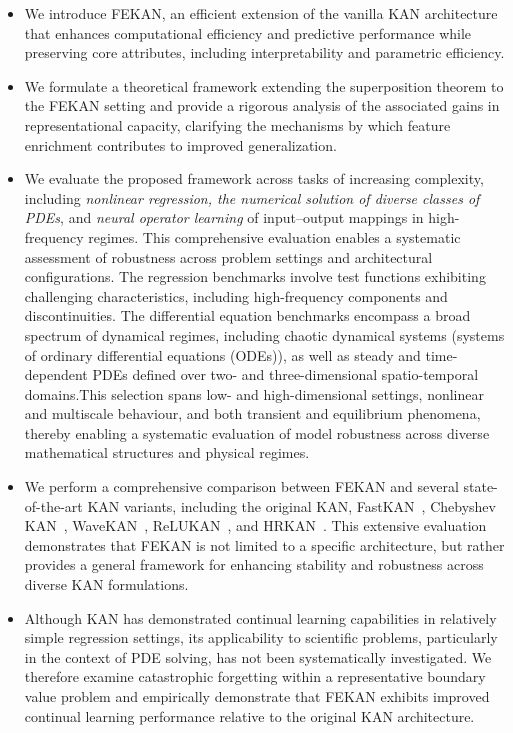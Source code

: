\documentclass{article}
\begin{document}
\begin{itemize}
    \item We introduce FEKAN, an efficient extension of the vanilla KAN architecture that enhances computational efficiency and predictive performance while preserving core attributes, including interpretability and parametric efficiency.
    \item We formulate a theoretical framework extending the superposition theorem to the FEKAN setting and provide a rigorous analysis of the associated gains in representational capacity, clarifying the mechanisms by which feature enrichment contributes to improved generalization.
    \item We evaluate the proposed framework across tasks of increasing complexity, including \textit{nonlinear regression, the numerical solution of diverse classes of PDEs}, and \textit{neural operator learning} of input–output mappings in high-frequency regimes. This comprehensive evaluation enables a systematic assessment of robustness across problem settings and architectural configurations.
    The regression benchmarks involve test functions exhibiting challenging characteristics, including high-frequency components and discontinuities. The differential equation benchmarks encompass a broad spectrum of dynamical regimes, including chaotic dynamical systems (systems of ordinary differential equations (ODEs)), as well as steady and time-dependent PDEs defined over two- and three-dimensional spatio-temporal domains.This selection spans low- and high-dimensional settings, nonlinear and multiscale behaviour, and both transient and equilibrium phenomena, thereby enabling a systematic evaluation of model robustness across diverse mathematical structures and physical regimes.

    \item We perform a comprehensive comparison between FEKAN and several state-of-the-art KAN variants, including the original KAN, FastKAN~\cite{li2024kolmogorov}, Chebyshev KAN~\cite{ss2024chebyshev}, WaveKAN~\cite{bozorgasl2405wav}, ReLUKAN~\cite{qiu2024relu}, and HRKAN~\cite{so2025higher}. This extensive evaluation demonstrates that FEKAN is not limited to a specific architecture, but rather provides a general framework for enhancing stability and robustness across diverse KAN formulations.

    \item Although KAN has demonstrated continual learning capabilities in relatively simple regression settings, its applicability to scientific problems, particularly in the context of PDE solving, has not been systematically investigated. We therefore examine catastrophic forgetting within a representative boundary value problem and empirically demonstrate that FEKAN exhibits improved continual learning performance relative to the original KAN architecture.

\end{itemize}
\end{document}
